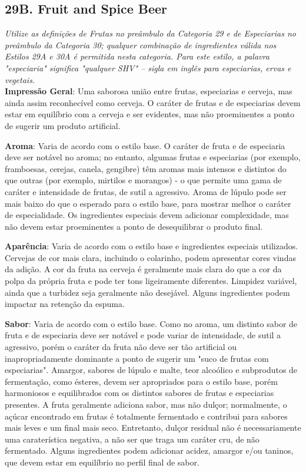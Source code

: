 \subsection*{29B. Fruit and Spice Beer}
\textit{Utilize as definições de Frutas no preâmbulo da Categoria 29 e de Especiarias no preâmbulo da Categoria 30; qualquer combinação de ingredientes válida nos Estilos 29A e 30A é permitida nesta categoria. Para este estilo, a palavra "especiaria" significa "qualquer SHV" – sigla em inglês para especiarias, ervas e vegetais.}\\
\textbf{Impressão Geral}: Uma saborosa união entre frutas, especiarias e cerveja, mas ainda assim reconhecível como cerveja. O caráter de frutas e de especiarias devem estar em equilíbrio com a cerveja e ser evidentes, mas não proeminentes a ponto de sugerir um produto artificial.

\textbf{Aroma}: Varia de acordo com o estilo base. O caráter de fruta e de especiaria deve ser notável no aroma; no entanto, algumas frutas e especiarias (por exemplo, framboesas, cerejas, canela, gengibre) têm aromas mais intensos e distintos do que outras (por exemplo, mirtilos e morangos) - o que permite uma gama de caráter e intensidade de frutas, de sutil a agressivo. Aroma de lúpulo pode ser mais baixo do que o esperado para o estilo base, para mostrar melhor o caráter de especialidade. Os ingredientes especiais devem adicionar complexidade, mas não devem estar proeminentes a ponto de desequilibrar o produto final.

\textbf{Aparência}: Varia de acordo com o estilo base e ingredientes especiais utilizados. Cervejas de cor mais clara, incluindo o colarinho, podem apresentar cores vindas da adição. A cor da fruta na cerveja é geralmente mais clara do que a cor da polpa da própria fruta e pode ter tons ligeiramente diferentes. Limpidez variável, ainda que a turbidez seja geralmente não desejável. Alguns ingredientes podem impactar na retenção da espuma.

\textbf{Sabor}: Varia de acordo com o estilo base. Como no aroma, um distinto sabor de fruta e de especiaria deve ser notável e pode variar de intensidade, de sutil a agressivo, porém o caráter da fruta não deve ser tão artificial ou inapropriadamente dominante a ponto de sugerir um "suco de frutas com especiarias". Amargor, sabores de lúpulo e malte, teor alcoólico e subprodutos de fermentação, como ésteres, devem ser apropriados para o estilo base, porém harmoniosos e equilibrados com os distintos sabores de frutas e especiarias presentes. A fruta geralmente adiciona sabor, mas não dulçor; normalmente, o açúcar encontrado em frutas é totalmente fermentado e contribui para sabores mais leves e um final mais seco. Entretanto, dulçor residual não é necessariamente uma caraterística negativa, a não ser que traga um caráter cru, de não fermentado. Alguns ingredientes podem adicionar acidez, amargor e/ou taninos, que devem estar em equilíbrio no perfil final de sabor.

